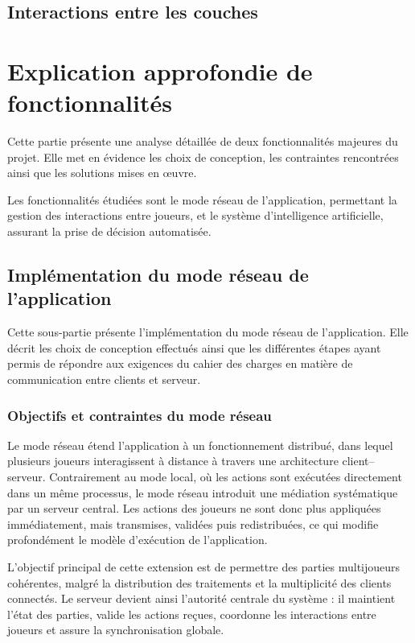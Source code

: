 \documentclass[a4paper]{article}
\begin{document}
\subsection{Interactions entre les couches}

\section{Explication approfondie de fonctionnalités}

Cette partie présente une analyse détaillée de deux fonctionnalités majeures du projet. Elle met en évidence les choix de conception, les contraintes rencontrées ainsi que les solutions mises en œuvre.

Les fonctionnalités étudiées sont le mode réseau de l’application, permettant la gestion des interactions entre joueurs, et le système d’intelligence artificielle, assurant la prise de décision automatisée.

\subsection{Implémentation du mode réseau de l'application}

Cette sous-partie présente l’implémentation du mode réseau de l’application. Elle décrit les choix de conception effectués ainsi que les différentes étapes ayant permis de répondre aux exigences du cahier des charges en matière de communication entre clients et serveur.

\subsubsection{Objectifs et contraintes du mode réseau}

Le mode réseau étend l’application à un fonctionnement distribué, dans lequel plusieurs joueurs interagissent à distance à travers une architecture client--serveur. Contrairement au mode local, où les actions sont exécutées directement dans un même processus, le mode réseau introduit une médiation systématique par un serveur central. Les actions des joueurs ne sont donc plus appliquées immédiatement, mais transmises, validées puis redistribuées, ce qui modifie profondément le modèle d’exécution de l’application.

L’objectif principal de cette extension est de permettre des parties multijoueurs cohérentes, malgré la distribution des traitements et la multiplicité des clients connectés. Le serveur devient ainsi l’autorité centrale du système : il maintient l’état des parties, valide les actions reçues, coordonne les interactions entre joueurs et assure la synchronisation globale.
\end{document}

